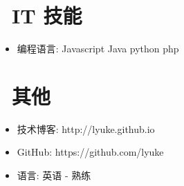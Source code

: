 \documentclass{resume}
\begin{document}

\section{\faCogs\ IT 技能}
\begin{itemize}[parsep=0.5ex]
  \item 编程语言: Javascript Java python php
\end{itemize}


\section{\faInfo\ 其他}
\begin{itemize}[parsep=0.5ex]
  \item 技术博客: http://lyuke.github.io
  \item GitHub: https://github.com/lyuke
  \item 语言: 英语 - 熟练
\end{itemize}

%
%
\end{document}
